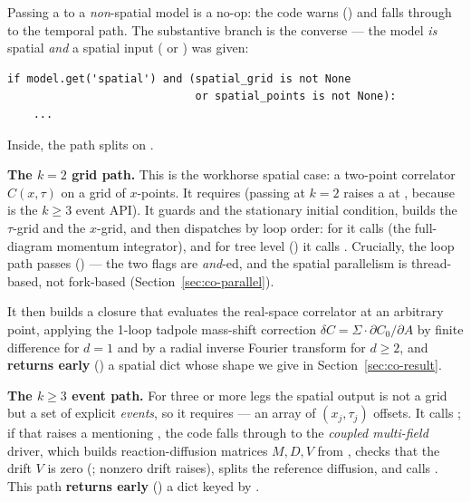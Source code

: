 Passing a  to a \emph{non}-spatial model is a no-op: the code
warns () and falls through to the temporal path.
The substantive branch is the converse --- the model \emph{is} spatial \emph{and}
a spatial input ( or ) was given:

\begin{lstlisting}
if model.get('spatial') and (spatial_grid is not None
                             or spatial_points is not None):
    ...
\end{lstlisting}

Inside, the path splits on .

\textbf{The $k=2$ grid path.} This is the workhorse spatial case: a two-point
correlator $C(x,\tau)$ on a grid of $x$-points. It requires 
(passing  at $k=2$ raises a  at
, because  is the $k\ge3$
event API). It guards  and the stationary initial
condition, builds the $\tau$-grid and the $x$-grid, and then dispatches by loop
order: for  it calls
 (the full-diagram momentum
integrator), and for tree level () it calls
. Crucially, the loop path
passes 
() --- the two flags are \emph{and}-ed, and the
spatial parallelism is thread-based, not fork-based (Section~\ref{sec:co-parallel}).

It then builds a  closure that evaluates the real-space correlator
at an arbitrary point, applying the 1-loop tadpole mass-shift correction
$\delta C = \Sigma\cdot\partial C_0/\partial A$ by finite difference for $d=1$
and by a radial inverse Fourier transform for $d\ge2$, and \textbf{returns early}
() a spatial dict whose shape we give in
Section~\ref{sec:co-result}.

\textbf{The $k\ge3$ event path.} For three or more legs the spatial output is not
a grid but a set of explicit \emph{events}, so it requires 
--- an  array of $(x_j, \tau_j)$ offsets. It calls
; if that raises a 
mentioning , the code falls through to the
\emph{coupled multi-field} driver, which builds reaction-diffusion matrices
$M, D, V$ from , checks that the drift $V$ is zero
(; nonzero drift raises), splits the reference
diffusion, and calls . This path \textbf{returns
early} () a dict keyed by .

